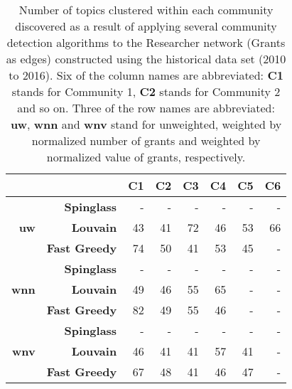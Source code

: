 \begin{table}[!htbp]
\centering
\caption[Number of topics clustered within each community discovered in the Researcher network (Grants as edges) constructed using the historical data set (2010 to 2016)]{Number of topics clustered within each community discovered as a result of applying several community detection algorithms to the Researcher network (Grants as edges) constructed using the historical data set (2010 to 2016). Six of the column names are abbreviated: \textbf{C1} stands for Community 1, \textbf{C2} stands for Community 2 and so on. Three of the row names are abbreviated: \textbf{uw}, \textbf{wnn} and \textbf{wnv} stand for unweighted, weighted by normalized number of grants and weighted by normalized value of grants, respectively.}
\label{table:researcher_b_past1_numbers_appendix}
\begin{tabular}{r|r|r|r|r|r|r|r}
\textbf{} & \textbf{} & \textbf{C1} & \textbf{C2} & \textbf{C3} & \textbf{C4} & \textbf{C5} & \textbf{C6}\\
\hline
\multirow{3}{*}{\textbf{uw}}
& \textbf{Spinglass} & {-} & {-} & {-} & {-} & {-} & {-}\\
& \textbf{Louvain} & {43} & {41} & {72} & {46} & {53} & {66}\\
& \textbf{Fast Greedy} & {74} & {50} & {41} & {53} & {45} & {-}\\
\hline
\multirow{3}{*}{\textbf{wnn}}
& \textbf{Spinglass} & {-} & {-} & {-} & {-} & {-} & {-}\\
& \textbf{Louvain} & {49} & {46} & {55} & {65} & {-} & {-}\\
& \textbf{Fast Greedy} & {82} & {49} & {55} & {46} & {-} & {-}\\
\hline
\multirow{3}{*}{\textbf{wnv}}
& \textbf{Spinglass} & {-} & {-} & {-} & {-} & {-} & {-}\\
& \textbf{Louvain} & {46} & {41} & {41} & {57} & {41} & {-}\\
& \textbf{Fast Greedy} & {67} & {48} & {41} & {46} & {47} & {-}
\end{tabular}
\end{table}

